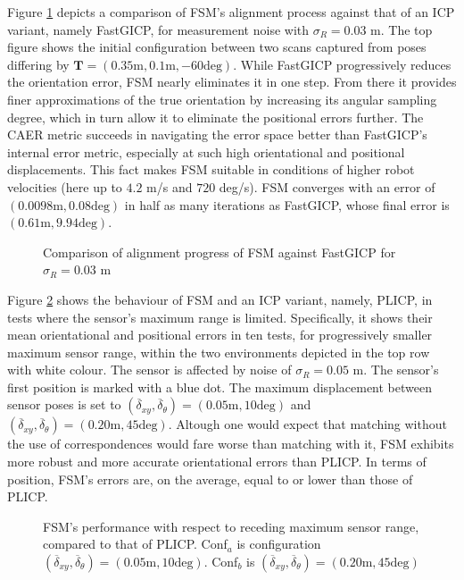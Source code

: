 Figure \ref{fig:char_fsm_vs_FGI} depicts a comparison of FSM's alignment
process against that of an ICP variant, namely FastGICP, for measurement noise
with $\sigma_R = 0.03$ m. The top figure shows the initial configuration
between two scans captured from poses differing by $\bm{T} = (0.35 \text{m},
0.1 \text{m}, -60 \text{deg})$. While FastGICP progressively reduces the
orientation error, FSM nearly eliminates it in one step. From there it provides
finer approximations of the true orientation by increasing its angular sampling
degree, which in turn allow it to eliminate the positional errors further. The
CAER metric succeeds in navigating the error space better than FastGICP's
internal error metric, especially at such high orientational and positional
displacements. This fact makes FSM suitable in conditions of higher robot
velocities (here up to $4.2$ m/s and $720$ deg/s). FSM converges with an error
of $(0.0098 \text{m}, 0.08 \text{deg})$ in half as many iterations as FastGICP,
whose final error is $(0.61 \text{m}, 9.94 \text{deg})$.

\begin{figure}
    \vspace{0.2cm}
    
    \caption{\small Comparison of alignment progress of FSM against FastGICP
             for $\sigma_R = 0.03$ m}%
    \label{fig:char_fsm_vs_FGI}%
\end{figure}

Figure \ref{fig:char_max_range_test} shows the behaviour of FSM and an ICP
variant, namely, PLICP, in tests where the sensor's maximum range is limited.
Specifically, it shows their mean orientational and positional errors in ten
tests, for progressively smaller maximum sensor range, within the two
environments depicted in the top row with white colour. The sensor is affected
by noise of $\sigma_R = 0.05$ m. The sensor's first position is marked with a
blue dot. The maximum displacement between sensor poses is set to
$(\overline{\delta}_{xy}, \overline{\delta}_{\theta}) = (0.05 \text{m}, 10 \text{deg})$
and
$(\overline{\delta}_{xy}, \overline{\delta}_{\theta}) = (0.20 \text{m}, 45 \text{deg})$.
Altough one would expect that matching without the use of correspondences would
fare worse than matching with it, FSM exhibits more robust and more accurate
orientational errors than PLICP. In terms of position, FSM's errors are, on
the average, equal to or lower than those of PLICP.


\begin{figure}\centering
\vspace{-0.2cm}
    
    \vspace{-1.5cm}
    \caption{\small FSM's performance with respect to receding maximum sensor
             range, compared to that of PLICP. Conf$_a$ is configuration
             $(\overline{\delta}_{xy}, \overline{\delta}_{\theta}) = (0.05 \text{m}, 10 \text{deg})$.
             Conf$_b$ is
             $(\overline{\delta}_{xy}, \overline{\delta}_{\theta}) = (0.20 \text{m}, 45 \text{deg})$
             }%
    \label{fig:char_max_range_test}%
\end{figure}
